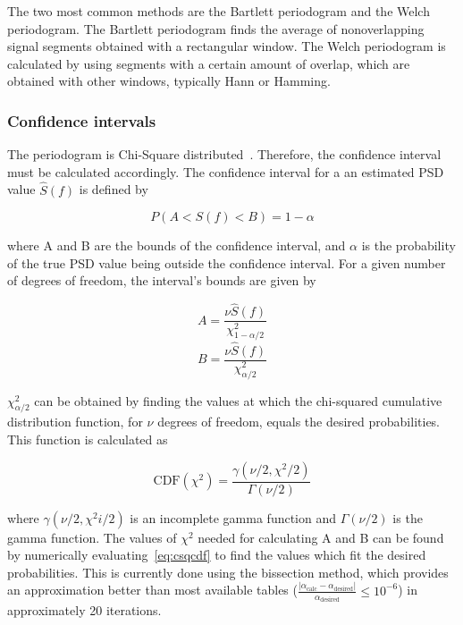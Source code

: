 \begin{refsection}
The two most common methods are the Bartlett periodogram and the Welch
periodogram. The Bartlett periodogram finds the average of nonoverlapping
signal segments obtained with a rectangular window. The Welch periodogram is
calculated by using segments with a certain amount of overlap, which are
obtained with other windows, typically Hann or Hamming.

\subsubsection*{Confidence intervals}
The periodogram is Chi-Square distributed~\cite{jeruchim06}. Therefore, the confidence interval
must be calculated accordingly. The confidence interval for a an estimated PSD
value $\hat{S}(f)$ is defined by~\cite{nsapplication255}

\begin{equation*}
	P\left( A < S(f) < B \right) = 1 - \alpha
\end{equation*}

\noindent where A and B are the bounds of the confidence interval, and $\alpha$ is the
probability of the true PSD value being outside the confidence interval. For a
given number of degrees of freedom, the interval's bounds are given by 

\begin{equation*}\label{eq:chsqBoundA}
	A = \frac{\nu \hat{S}(f)}{\chi^2_{1-\alpha/2}}
\end{equation*}
\begin{equation*}\label{eq:chsqBoundB}
	B = \frac{\nu \hat{S}(f)}{\chi^2_{\alpha/2}}
\end{equation*}

$\chi^2_{\alpha/2}$ can be obtained by finding the values at which the
chi-squared cumulative distribution function, for $\nu$ degrees of freedom, equals the desired 
probabilities. This function is calculated as~\cite{weisstein18csd}

\begin{equation}\label{eq:csqcdf}
	\text{CDF}(\chi^2) = \frac{\gamma \left(\nu/2, \chi^2/2\right)}
	{\Gamma\left(\nu/2\right)}
\end{equation}

\noindent where $\gamma\left(\nu/2,\chi^2i/2\right)$ is an incomplete gamma function and
	$\Gamma(\nu/2)$ is the gamma function. The values of $\chi^2$ needed for
	calculating A and B can be found by numerically evaluating~\ref{eq:csqcdf}
	to find the values which fit the desired probabilities. This is currently
	done using the bissection method, which provides an approximation better
	than most available tables 
	($\frac{|\alpha_{\text{calc}}-\alpha_{\text{desired}}|}{\alpha_{\text{desired}}}
	\le 10^{-6}$) in approximately 20 iterations.


\end{refsection}
